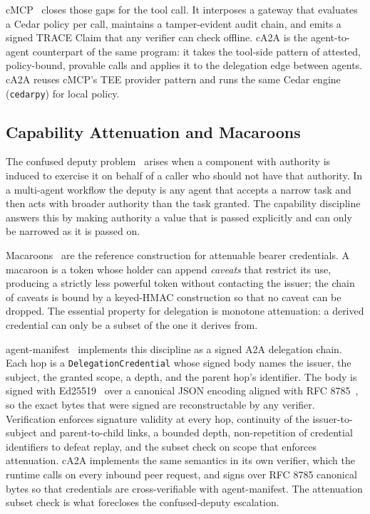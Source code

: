 cMCP~\citep{cmcp2026} closes those gaps for the tool call. It interposes a gateway that
evaluates a Cedar policy per call, maintains a tamper-evident audit chain, and emits a
signed TRACE Claim that any verifier can check offline. cA2A is the agent-to-agent
counterpart of the same program: it takes the tool-side pattern of attested, policy-bound,
provable calls and applies it to the delegation edge between agents. cA2A reuses cMCP's
TEE provider pattern and runs the same Cedar engine (\texttt{cedarpy}) for local policy.

\subsection{Capability Attenuation and Macaroons}

The confused deputy problem~\citep{confuseddeputy1988} arises when a component with
authority is induced to exercise it on behalf of a caller who should not have that
authority. In a multi-agent workflow the deputy is any agent that accepts a narrow task
and then acts with broader authority than the task granted. The capability discipline
answers this by making authority a value that is passed explicitly and can only be
narrowed as it is passed on.

Macaroons~\citep{macaroons2014} are the reference construction for attenuable bearer
credentials. A macaroon is a token whose holder can append \emph{caveats} that restrict
its use, producing a strictly less powerful token without contacting the issuer; the chain
of caveats is bound by a keyed-HMAC construction so that no caveat can be dropped. The
essential property for delegation is monotone attenuation: a derived credential can only
be a subset of the one it derives from.

agent-manifest~\citep{agentmanifest2026} implements this discipline as a signed A2A
delegation chain. Each hop is a \texttt{DelegationCredential} whose signed body names the
issuer, the subject, the granted scope, a depth, and the parent hop's identifier. The body
is signed with Ed25519~\citep{eddsa2017} over a canonical JSON encoding aligned with RFC
8785~\citep{jcs2020}, so the exact bytes that were signed are reconstructable by any
verifier. Verification enforces signature validity at every hop, continuity of the
issuer-to-subject and parent-to-child links, a bounded depth, non-repetition of credential
identifiers to defeat replay, and the subset check on scope that enforces attenuation. cA2A
implements the same semantics in its own verifier, which the runtime calls on every inbound
peer request, and signs over RFC 8785 canonical bytes so that credentials are
cross-verifiable with agent-manifest. The attenuation subset check is what forecloses the
confused-deputy escalation.

